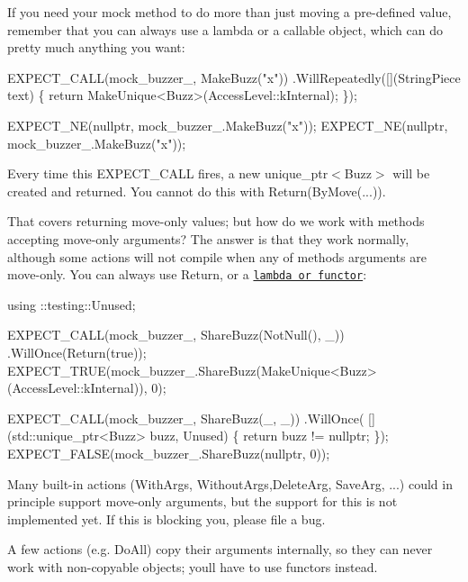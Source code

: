 If you need your mock method to do more than just moving a pre-\/defined value, remember that you can always use a lambda or a callable object, which can do pretty much anything you want\+:


\begin{DoxyCode}
EXPECT\_CALL(mock\_buzzer\_, MakeBuzz(\textcolor{stringliteral}{"x"}))
    .WillRepeatedly([](StringPiece text) \{
      \textcolor{keywordflow}{return} MakeUnique<Buzz>(AccessLevel::kInternal);
    \});

EXPECT\_NE(\textcolor{keyword}{nullptr}, mock\_buzzer\_.MakeBuzz(\textcolor{stringliteral}{"x"}));
EXPECT\_NE(\textcolor{keyword}{nullptr}, mock\_buzzer\_.MakeBuzz(\textcolor{stringliteral}{"x"}));
\end{DoxyCode}


Every time this {\ttfamily E\+X\+P\+E\+C\+T\+\_\+\+C\+A\+LL} fires, a new {\ttfamily unique\+\_\+ptr$<$Buzz$>$} will be created and returned. You cannot do this with {\ttfamily Return(By\+Move(...))}.

That covers returning move-\/only values; but how do we work with methods accepting move-\/only arguments? The answer is that they work normally, although some actions will not compile when any of method\textquotesingle{}s arguments are move-\/only. You can always use {\ttfamily Return}, or a \href{#using-functionsmethodsfunctors-as-actions}{\tt lambda or functor}\+:


\begin{DoxyCode}
using ::testing::Unused;

EXPECT\_CALL(mock\_buzzer\_, ShareBuzz(NotNull(), \_)) .WillOnce(Return(\textcolor{keyword}{true}));
EXPECT\_TRUE(mock\_buzzer\_.ShareBuzz(MakeUnique<Buzz>(AccessLevel::kInternal)),
            0);

EXPECT\_CALL(mock\_buzzer\_, ShareBuzz(\_, \_)) .WillOnce(
    [](std::unique\_ptr<Buzz> buzz, Unused) \{ \textcolor{keywordflow}{return} buzz != \textcolor{keyword}{nullptr}; \});
EXPECT\_FALSE(mock\_buzzer\_.ShareBuzz(\textcolor{keyword}{nullptr}, 0));
\end{DoxyCode}


Many built-\/in actions ({\ttfamily With\+Args}, {\ttfamily Without\+Args},{\ttfamily Delete\+Arg}, {\ttfamily Save\+Arg}, ...) could in principle support move-\/only arguments, but the support for this is not implemented yet. If this is blocking you, please file a bug.

A few actions (e.\+g. {\ttfamily Do\+All}) copy their arguments internally, so they can never work with non-\/copyable objects; you\textquotesingle{}ll have to use functors instead.

